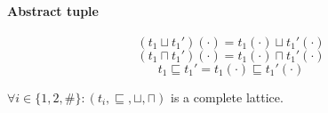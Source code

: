 \paragraph{Abstract tuple}

\begin{equation*}
    (t_1 \sqcup t_1')(\cdot) = t_1(\cdot) \sqcup t_1'(\cdot)
\end{equation*}
\begin{equation*}
    (t_1 \sqcap t_1')(\cdot) = t_1(\cdot) \sqcap t_1'(\cdot)
\end{equation*}
\begin{equation*}
    t_1 \sqsubseteq t_1' = t_1(\cdot) \sqsubseteq t_1'(\cdot)
\end{equation*}

\begin{theorem}
    $\forall i \in \{1, 2, \#\} : (t_i, \sqsubseteq, \sqcup, \sqcap)$ is a complete lattice.
\end{theorem}
